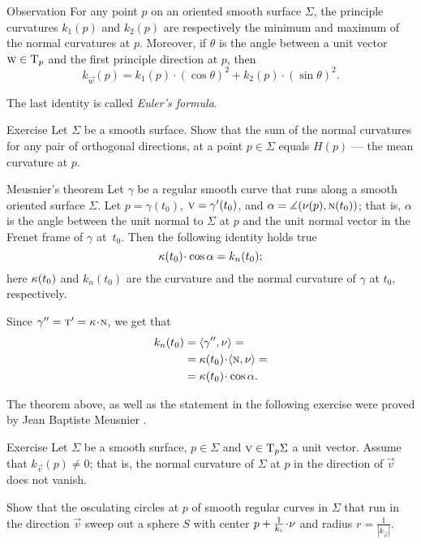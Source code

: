 \begin{thm}{Observation}\label{obs:k1-k2}
For any point $p$ on an oriented smooth surface $\Sigma$,
the principle curvatures $k_1(p)$ and $k_2(p)$ are respectively the minimum and maximum of the normal curvatures at $p$.
Moreover, if $\theta$ is the angle between a unit vector ${\text{\sc{w}}}\in\mathrm{T}_p$ and the first principle direction at $p$, then 
\[k_{\vec w}(p)=k_1(p)\cdot(\cos\theta)^2+k_2(p)\cdot(\sin\theta)^2.\]

\end{thm}

The last identity is called \emph{Euler's formula}.

\begin{thm}{Exercise}\label{ex:mean-curvature}
Let  $\Sigma$ be a smooth surface.
Show that the sum of the normal curvatures for any pair of orthogonal directions, at a point $p\in\Sigma$ equals $H(p)$ --- the mean curvature at $p$. 
\end{thm}




\begin{thm}{Meusnier's theorem}\label{thm:meusnier}
Let $\gamma$ be a regular smooth curve that runs along a smooth oriented surface $\Sigma$.
Let $p=\gamma(t_0)$, ${\vec v}\z=\gamma'(t_0)$, and $\alpha=\measuredangle(\nu(p),\text{\sc{n}}(t_0))$;
that is, $\alpha$ is the angle between the unit normal to $\Sigma$ at $p$ and the unit normal vector in the Frenet frame of $\gamma$ at~$t_0$.
Then the following identity holds true 
\[\kur(t_0)\cdot\cos\alpha=k_{n}(t_0);\]
here $\kappa(t_0)$  and $k_n(t_0)$ are the curvature and the normal curvature of $\gamma$ at $t_0$, respectively.  
\end{thm}


 Since $\gamma''=\tan'=\kur\cdot \norm$, we get that
\begin{align*}
k_{n}(t_0)&=\langle\gamma'',\Norm\rangle=
\\
&=\kur(t_0)\cdot\langle\norm,\Norm\rangle=
\\
&=\kur(t_0)\cdot\cos\alpha.
\end{align*}
\qedsf

The theorem above, as well as the statement in the following exercise were proved by Jean Baptiste Meusnier \cite{meusnier}.

\begin{thm}{Exercise}\label{ex:meusnier}
Let $\Sigma$ be a smooth surface, $p\in\Sigma$ and ${\text{\sc{v}}}\in \mathrm{T}_p\Sigma$ a unit vector.
Assume that $k_{\vec v}(p)\ne 0$; that is, the normal curvature of $\Sigma$ at $p$ in the direction of ${\vec v}$ does not vanish.

Show that the osculating circles at $p$ of smooth regular curves in $\Sigma$ that run in the direction ${\vec v}$ sweep out a sphere $S$ with center $p+\tfrac1{k_{\vec v}}\cdot\Norm$ and radius $r=\tfrac1{|k_{\vec v}|}$.
\end{thm}

